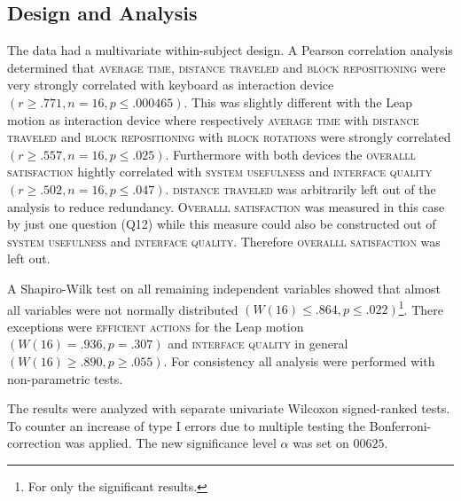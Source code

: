 \subsection{Design and Analysis}
The data had a multivariate within-subject design. A Pearson correlation analysis determined that \textsc{average time}, \textsc{distance traveled} and \textsc{block repositioning} were very strongly correlated with keyboard as interaction device $(r \geq .771, n = 16, p \leq .000465)$. This was slightly different with the Leap motion as interaction device where respectively \textsc{average time} with \textsc{distance traveled} and \textsc{block repositioning} with \textsc{block rotations} were strongly correlated $(r  \geq .557, n = 16, p \leq .025)$. Furthermore with both devices the \textsc{overalll satisfaction} hightly correlated with \textsc{system usefulness} and \textsc{interface quality}$(r  \geq .502, n = 16, p \leq .047)$. \textsc{distance traveled} was arbitrarily left out of the analysis to reduce redundancy. \textsc{Overalll satisfaction} was measured in this case by just one question (Q12) while this measure could also be constructed out of \textsc{system usefulness} and \textsc{interface quality}. Therefore \textsc{overalll satisfaction} was left out.

A Shapiro-Wilk test on all remaining independent variables showed that almost all variables were not normally distributed $(W(16) \leq .864, p \leq .022 )$\footnote{For only the significant results.}. There exceptions were \textsc{efficient actions} for the Leap motion $(W(16) = .936, p = .307)$ and \textsc{interface quality} in general $(W(16) \geq .890, p \geq .055)$. For consistency all analysis were performed with non-parametric tests.

The results were analyzed with separate univariate Wilcoxon signed-ranked tests. To counter an increase of type I errors due to multiple testing the Bonferroni-correction was applied\cite{dunn61}. The new significance level $\alpha$ was set on $00625$.
